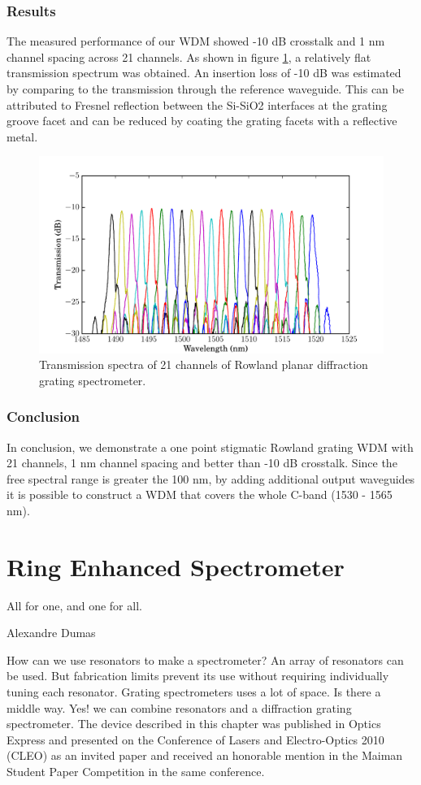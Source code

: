 \documentclass[12pt,twoside,english]{book}
\renewcommand{\~}{\perispomeni}%
\numberwithin{equation}{section}
\numberwithin{figure}{section}
\begin{document}
\subsection{Results}
The measured performance of our \gls{WDM} showed -10 dB crosstalk and 1 nm channel spacing across 21 channels. As shown in figure \ref{fig:spectrum 1}, a relatively flat transmission spectrum was obtained. An insertion loss of -10 dB was estimated by comparing to the transmission through the reference waveguide. This can be attributed to Fresnel reflection between the Si-SiO2 interfaces at the grating groove facet and can be reduced by coating the grating facets with a reflective metal.
\begin{figure}[h]
\includegraphics{graphs/gen5}
\caption{Transmission spectra of 21 channels of Rowland planar diffraction grating spectrometer.}
\label{fig:spectrum 1}
\end{figure}

\subsection{Conclusion}
In conclusion, we demonstrate a one point stigmatic Rowland grating \gls{WDM} with 21 channels, 1 nm channel spacing and better than -10 dB crosstalk. Since the free spectral range is greater the 100 nm, by adding additional output waveguides it is possible to construct a \gls{WDM} that covers the whole C-band (1530 - 1565 nm).%

\chapter{Ring Enhanced Spectrometer}
\epigraph{All for one, and one for all.}
{Alexandre Dumas}
How can we use resonators to make a spectrometer? An array of resonators can be used. But fabrication limits prevent its use without requiring individually tuning each resonator. Grating spectrometers uses a lot of space. Is there a middle way. Yes! we can combine resonators and a diffraction grating spectrometer. The device described in this chapter was published in Optics Express and presented on the Conference of Lasers and Electro-Optics 2010 (CLEO) as an invited paper and received an honorable mention in the Maiman Student Paper Competition in the same conference.
\end{document}

